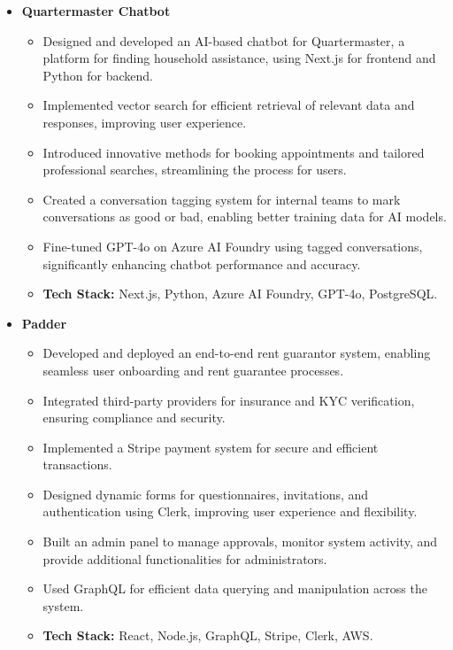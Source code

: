 \documentclass[a4paper,10pt]{article}
\begin{document}
\begin{itemize}[leftmargin=0.5cm]
    \item \textbf{Quartermaster Chatbot}
    \begin{itemize}
       \item Designed and developed an AI-based chatbot for Quartermaster, a platform for finding household assistance, using Next.js for frontend and Python for backend.
       \item Implemented vector search for efficient retrieval of relevant data and responses, improving user experience.
       \item Introduced innovative methods for booking appointments and tailored professional searches, streamlining the process for users.
       \item Created a conversation tagging system for internal teams to mark conversations as good or bad, enabling better training data for AI models.
       \item Fine-tuned GPT-4o on Azure AI Foundry using tagged conversations, significantly enhancing chatbot performance and accuracy.
       \item \textbf{Tech Stack:} Next.js, Python, Azure AI Foundry, GPT-4o, PostgreSQL.
    \end{itemize}
    
    \item \textbf{Padder}
    \begin{itemize}
       \item Developed and deployed an end-to-end rent guarantor system, enabling seamless user onboarding and rent guarantee processes.
       \item Integrated third-party providers for insurance and KYC verification, ensuring compliance and security.
       \item Implemented a Stripe payment system for secure and efficient transactions.
       \item Designed dynamic forms for questionnaires, invitations, and authentication using Clerk, improving user experience and flexibility.
       \item Built an admin panel to manage approvals, monitor system activity, and provide additional functionalities for administrators.
       \item Used GraphQL for efficient data querying and manipulation across the system.
       \item \textbf{Tech Stack:} React, Node.js, GraphQL, Stripe, Clerk, AWS.
    \end{itemize}
    

\end{itemize}
\end{document}
